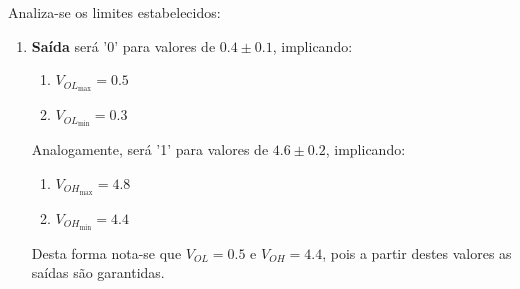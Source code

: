 \documentclass{article}
\begin{document}
            \begin{resolution}
                Analiza-se os limites estabelecidos:
                    \begin{enumerate}[rightmargin = \leftmargin]
                        \item \textbf{Saída} será '0' para valores de $0.4 \pm 0.1$, implicando:
                            \begin{enumerate}[noitemsep, rightmargin = \leftmargin]
                                \item $V_{OL_{\text{max}}} = 0.5$
                                \item $V_{OL_{\text{min}}} = 0.3$
                            \end{enumerate}
                        Analogamente, será '1' para valores de $4.6 \pm 0.2$, implicando:
                            \begin{enumerate}[noitemsep, rightmargin = \leftmargin]
                                \item $V_{OH_{\text{max}}} = 4.8$
                                \item $V_{OH_{\text{min}}} = 4.4$
                            \end{enumerate}
                        Desta forma nota-se que $V_{OL} = 0.5$ e $V_{OH} = 4.4$, pois a partir destes valores as saídas são garantidas.
                        

\end{enumerate}
\end{resolution}
\end{document}
